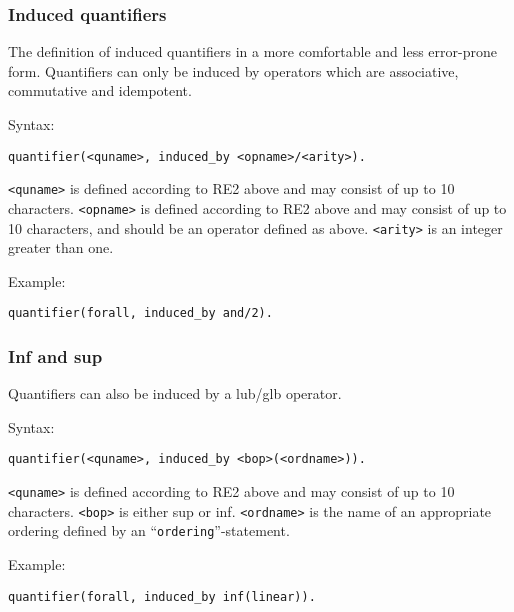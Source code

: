 \documentclass[
]{article}
\newcommand{\passthrough}[1]{#1}
\begin{document}
\hypertarget{induced-quantifiers}{%
\subsubsection{Induced quantifiers}\label{induced-quantifiers}}

The definition of induced quantifiers in a more comfortable and less
error-prone form. Quantifiers can only be induced by operators which are
associative, commutative and idempotent.

Syntax:

\begin{lstlisting}
quantifier(<quname>, induced_by <opname>/<arity>).
\end{lstlisting}

\passthrough{\lstinline!<quname>!} is defined according to RE2 above and
may consist of up to 10 characters. \passthrough{\lstinline!<opname>!}
is defined according to RE2 above and may consist of up to 10
characters, and should be an operator defined as above.
\passthrough{\lstinline!<arity>!} is an integer greater than one.

Example:

\begin{lstlisting}
quantifier(forall, induced_by and/2).
\end{lstlisting}

\hypertarget{inf-and-sup-1}{%
\subsubsection{Inf and sup}\label{inf-and-sup-1}}

Quantifiers can also be induced by a lub/glb operator.

Syntax:

\begin{lstlisting}
quantifier(<quname>, induced_by <bop>(<ordname>)).
\end{lstlisting}

\passthrough{\lstinline!<quname>!} is defined according to RE2 above and
may consist of up to 10 characters. \passthrough{\lstinline!<bop>!} is
either sup or inf. \passthrough{\lstinline!<ordname>!} is the name of an
appropriate ordering defined by an
``\passthrough{\lstinline!ordering!}''-statement.

Example:

\begin{lstlisting}
quantifier(forall, induced_by inf(linear)).
\end{lstlisting}
\end{document}

